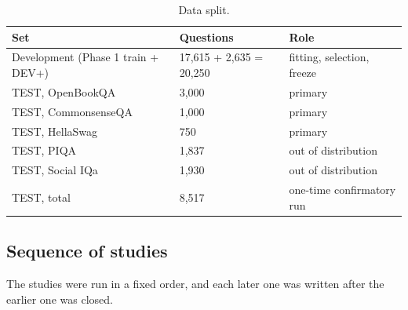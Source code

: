 \begin{table}[t]
\centering\small
\caption{Data split.}
\begin{tabular}{@{}lll@{}}
\toprule
Set & Questions & Role \\
\midrule
Development (Phase 1 train + DEV+) & 17,615 + 2,635 = 20,250 & fitting, selection, freeze \\
TEST, OpenBookQA & 3,000 & primary \\
TEST, CommonsenseQA & 1,000 & primary \\
TEST, HellaSwag & 750 & primary \\
TEST, PIQA & 1,837 & out of distribution \\
TEST, Social IQa & 1,930 & out of distribution \\
TEST, total & 8,517 & one-time confirmatory run \\
\bottomrule
\end{tabular}
\end{table}

\subsection{Sequence of studies}

The studies were run in a fixed order, and each later one was written after the earlier one was closed.

